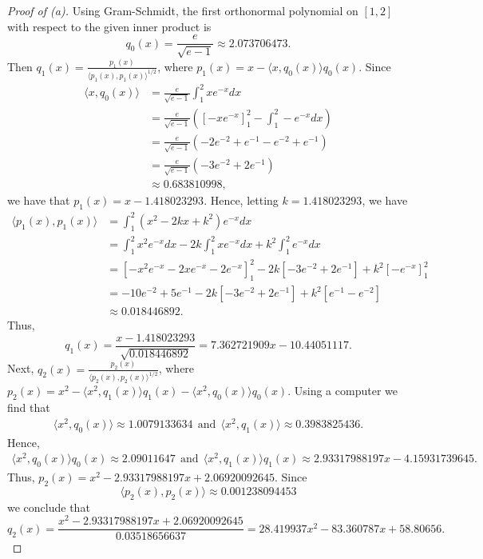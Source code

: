 \documentclass[8pt]{article}
\theoremstyle{definition}
\begin{document}
\begin{proof}[Proof of (a)]
Using Gram-Schmidt, the first orthonormal polynomial on $[1, 2]$ with respect to the given inner product is $$q_0 (x) = \frac{e}{\sqrt{e - 1}} \approx 2.073706473.$$ Then $\displaystyle q_1 (x) = \frac{p_1 (x)}{\langle p_1 (x), p_1 (x) \rangle^{1/2}}$, where $p_1 (x) = x - \langle x, q_0 (x) \rangle q_0 (x)$. Since
\begin{align*}
\langle x, q_0 (x) \rangle &= \frac{e}{\sqrt{e - 1}} \int_{1}^{2} x e^{-x} dx \\
&= \frac{e}{\sqrt{e - 1}} \left( \left[ -x e^{-x} \right]_{1}^{2} - \int_{1}^{2} - e^{-x} dx \right) \\
&= \frac{e}{\sqrt{e - 1}} \left( -2 e^{-2} + e^{-1} - e^{-2} + e^{-1} \right) \\
&= \frac{e}{\sqrt{e - 1}} \left( -3 e^{-2} + 2 e^{-1} \right) \\
&\approx 0.683810998,
\end{align*}
we have that $p_1 (x) = x - 1.418023293$. Hence, letting $k = 1.418023293$, we have
\begin{align*}
\langle p_1 (x), p_1 (x) \rangle &= \int_{1}^{2} \left( x^2 - 2 k x + k^2 \right) e^{-x} dx \\
&= \int_{1}^{2} x^2 e^{-x} dx - 2 k \int_{1}^{2} x e^{-x} dx + k^2 \int_{1}^{2} e^{-x} dx \\
&= \left[ -x^2 e^{-x} - 2 x e^{-x} - 2 e^{-x} \right]_{1}^{2} - 2k [-3 e^{-2} + 2 e^{-1}] + k^2 \left[ -e^{-x} \right]_{1}^{2} \\
&= -10 e^{-2} + 5 e^{-1} - 2 k [-3 e^{-2} + 2 e^{-1}] + k^2 [e^{-1} - e^{-2}] \\
&\approx 0.018446892.
\end{align*}
Thus, $$q_1 (x) = \frac{x - 1.418023293}{\sqrt{0.018446892}} = 7.362721909 x - 10.44051117.$$ Next, $\displaystyle q_2 (x) = \frac{p_2 (x)}{\langle p_2 (x), p_2 (x) \rangle^{1/2}}$, where $p_2 (x) = x^2 - \langle x^2, q_1 (x) \rangle q_1 (x) - \langle x^2, q_0 (x) \rangle q_0 (x)$. Using a computer we find that 
\begin{align*}
\langle x^2, q_0 (x) \rangle \approx 1.0079133634 \ \ \text{and} \ \ \langle x^2, q_1 (x) \rangle \approx 0.3983825436.
\end{align*}
Hence, 
\begin{align*}
\langle x^2, q_0 (x) \rangle q_0 (x) \approx 2.09011647 \ \ \text{and} \ \ \langle x^2, q_1 (x) \rangle q_1 (x) \approx 2.93317988197 x - 4.15931739645.
\end{align*}
Thus, $p_{2} (x) = x^2 - 2.93317988197 x + 2.06920092645.$ Since $$\langle p_2 (x), p_2 (x) \rangle \approx 0.001238094453$$ we conclude that $$q_2 (x) = \frac{x^2 - 2.93317988197 x + 2.06920092645}{0.03518656637} = 28.419937 x^2 - 83.360787 x + 58.80656.$$
\end{proof}
\end{document}
